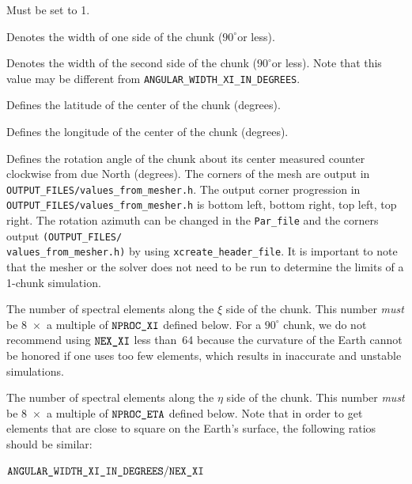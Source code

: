 \documentclass[oneside,english]{book}
\newenvironment{lyxcode}
{\begin{list}{}{
\setlength{\rightmargin}{\leftmargin}
\setlength{\listparindent}{0pt}%
\raggedright
\setlength{\itemsep}{0pt}
\setlength{\parsep}{0pt}
\normalfont\ttfamily}%
 \item[]}
{\end{list}}
\newcommand{\nexxi}{\mbox{\texttt{NEX\_XI}}}
\newcommand{\nexeta}{\mbox{\texttt{NEX\_ETA}}}
\newcommand{\nprocxi}{\mbox{\texttt{NPROC\_XI}}}
\newcommand{\nproceta}{\mbox{\texttt{NPROC\_ETA}}}
\newcommand{\nchunks}{\mbox{\texttt{NCHUNKS}}}
\begin{document}
\begin{description}
\item [{$\nchunks$}] Must be set to 1.
\item [{\texttt{ANGULAR\_WIDTH\_XI\_IN\_DEGREES}}] Denotes the width of
one side of the chunk ($90^{\circ}$or less).
\item [{\texttt{ANGULAR\_WIDTH\_ETA\_IN\_DEGREES}}] Denotes the width of
the second side of the chunk ($90^{\circ}$or less). Note that this
value may be different from \texttt{ANGULAR\_WIDTH\_XI\_IN\_DEGREES}.
\item [{\texttt{CENTER\_LATITUDE\_IN\_DEGREES}}] Defines the latitude of
the center of the chunk (degrees).
\item [{\texttt{CENTER\_LONGITUDE\_IN\_DEGREES}}] Defines the longitude
of the center of the chunk (degrees).
\item [{\texttt{GAMMA\_ROTATION\_AZIMUTH}}] Defines the rotation angle
of the chunk about its center measured counter clockwise from due
North (degrees). The corners of the mesh are output in \texttt{\small OUTPUT\_FILES/values\_from\_mesher.h}.
The output corner progression in \texttt{\small OUTPUT\_FILES/values\_from\_mesher.h}
is bottom left, bottom right, top left, top right. The rotation azimuth
can be changed in the \texttt{Par\_file} and the corners output \texttt{(}\texttt{\small OUTPUT\_FILES/}~\\
\texttt{\small values\_from\_mesher.h}\texttt{)} by using{\small{}
}\texttt{\small xcreate\_header\_file}. It is important to note that
the mesher or the solver does not need to be run to determine the
limits of a 1-chunk simulation.
\item [{$\nexxi$}] The number of spectral elements along the $\xi$ side
of the chunk. This number \textit{must} be 8~$\times$~a multiple
of $\nprocxi$ defined below. For a $90^{\circ}$ chunk, we do not
recommend using $\nexxi$ less than~64 because the curvature of the
Earth cannot be honored if one uses too few elements, which results
in inaccurate and unstable simulations.
\item [{$\nexeta$}] The number of spectral elements along the $\eta$
side of the chunk. This number \textit{must} be 8~$\times$~a multiple
of $\nproceta$ defined below. Note that in order to get elements
that are close to square on the Earth's surface, the following ratios
should be similar:

\begin{lyxcode}
$\texttt{ANGULAR\_WIDTH\_XI\_IN\_DEGREES}/\nexxi$


\end{lyxcode}
\end{description}
\end{document}
